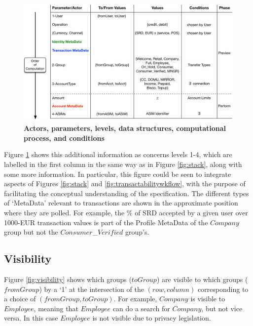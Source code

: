 \begin{figure}[htbp]
\centering
\includegraphics[width=17cm]{Figures/Vocabulary}
\caption{\small\textbf{Actors, parameters, levels, data structures, computational process, and conditions}}
\label{fig:vocabulary}
\end{figure}

Figure \ref{fig:vocabulary} shows this additional information as concerns levels 1-4, which are labelled in the first column in the same way as in Figure \ref{fig:stack}, along with some more information. In particular, this figure could be seen to integrate aspects of Figures \ref{fig:stack} and \ref{fig:transactabilitywkflow}, with the purpose of facilitating the conceptual understanding of the specification. The different types of `MetaData' relevant to transactions are shown in the approximate position where they are polled. For example, the $\%$ of SRD accepted by a given user over 1000-EUR transaction values is part of the Profile MetaData of the $Company$ group but not the $Consumer$\_$Verified$ group's.

\subsection{Visibility}
Figure \ref{fig:visibility} shows which groups ($toGroup$) are visible to which groups ($fromGroup$) by a `1' at the intersection of the $(row, column)$ corresponding to a choice of $(fromGroup, toGroup)$. For example, $Company$ is visible to $Employee$, meaning that $Employee$ can do a search for $Company$, but not vice versa. In this case $Employee$ is not visible due to privacy legislation.

